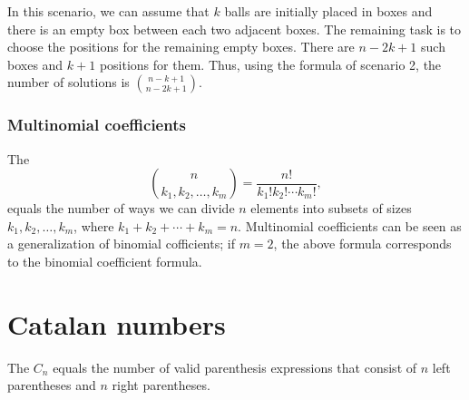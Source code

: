 \begin{center}
\end{center}

In this scenario, we can assume that
$k$ balls are initially placed in boxes
and there is an empty box between each
two adjacent boxes.
The remaining task is to choose the
positions for the remaining empty boxes.
There are $n-2k+1$ such boxes and
$k+1$ positions for them.
Thus, using the formula of scenario 2,
the number of solutions is
$\binom{n-k+1}{n-2k+1}$.

\subsubsection{Multinomial coefficients}


The 
\[ \binom{n}{k_1,k_2,\ldots,k_m} = \frac{n!}{k_1! k_2! \cdots k_m!}, \]
equals the number of ways
we can divide $n$ elements into subsets
of sizes $k_1,k_2,\ldots,k_m$,
where $k_1+k_2+\cdots+k_m=n$.
Multinomial coefficients can be seen as a
generalization of binomial cofficients;
if $m=2$, the above formula
corresponds to the binomial coefficient formula.

\section{Catalan numbers}


The 
$C_n$ equals the
number of valid
parenthesis expressions that consist of
$n$ left parentheses and $n$ right parentheses.

